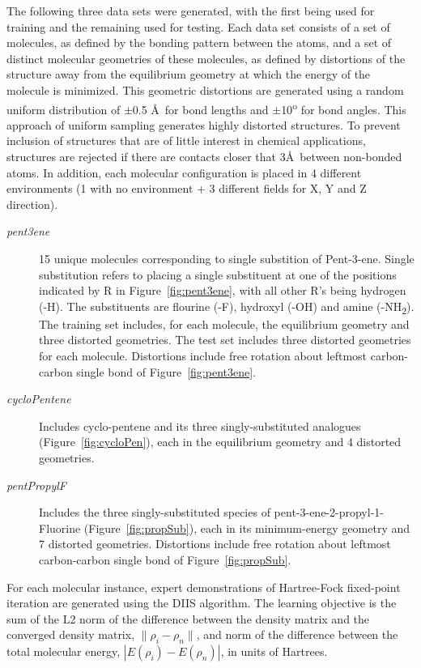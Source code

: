 \documentclass[twoside,11pt]{article}
\begin{document}
The following three data sets were generated, with the first being used for training and the remaining used for testing. Each data set consists of a set of molecules, as defined by the bonding pattern between the atoms, and a set of distinct molecular geometries of these molecules, as defined by distortions of the structure away from the equilibrium geometry at which the energy of the molecule is minimized. This geometric distortions are generated using a random uniform distribution of $\pm$0.5 \AA\ for bond lengths and $\pm$10\textsuperscript{o} for bond angles.  This approach of uniform sampling generates highly distorted structures. To prevent inclusion of structures that are of little interest in chemical applications, structures are rejected if there are contacts closer that 3\AA\ between non-bonded atoms.  In addition, each molecular configuration is placed in 4 different environments (1 with no environment + 3 different fields for X, Y and Z direction).
\begin{description}
\item[\textit{pent3ene}] 15 unique molecules corresponding to single substition of Pent-3-ene. Single substitution refers to placing a single substituent at one of the positions indicated by R in Figure~\ref{fig:pent3ene}, with all other R's being hydrogen (-H). The substituents are flourine (-F), hydroxyl (-OH) and amine (-NH\textsubscript{2}). The training set includes, for each molecule, the equilibrium geometry and three distorted geometries. The test set includes three distorted geometries for each molecule. Distortions include free rotation about leftmost carbon-carbon single bond of Figure~\ref{fig:pent3ene}. 
\item[\textit{cycloPentene}]Includes cyclo-pentene and its three singly-substituted analogues (Figure~\ref{fig:cycloPen}), each in the equilibrium geometry and 4 distorted geometries. 
\item[\textit{pentPropylF}] Includes the three singly-substituted species of pent-3-ene-2-propyl-1-Fluorine (Figure~\ref{fig:propSub}), each in its minimum-energy geometry and 7 distorted geometries. Distortions include free rotation about leftmost carbon-carbon single bond of Figure~\ref{fig:propSub}. 
\end{description}

For each molecular instance, expert demonstrations of Hartree-Fock fixed-point iteration are generated using the DIIS algorithm\cite{Pulay1980}. The learning objective is the sum of the L2 norm of the difference between the density matrix and the converged density matrix, $\|\rho_i-\rho_n\|$, and norm of the difference between the total molecular energy, $|E(\rho_i)-E(\rho_n)|$, in units of Hartrees. 
\end{document}
